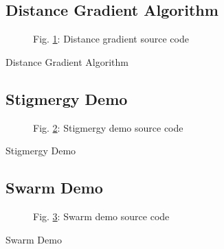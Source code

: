 \documentclass{beamer}
\begin{document}
	\subsection{Distance Gradient Algorithm}
	\begin{frame}
		\begin{figure}
			
			\caption{
				\label{figure:gradient code}Fig. \ref{figure:gradient code}: Distance gradient source code}
		\end{figure}
	\end{frame}
	\begin{frame}{Distance Gradient Algorithm}
		\centering
	\end{frame}
	\subsection{Stigmergy Demo}
	\begin{frame}
		\begin{figure}
			
			\caption{
				\label{figure:stigmergy code}Fig. \ref{figure:stigmergy code}: Stigmergy demo source code}
		\end{figure}
	\end{frame}
	\begin{frame}{Stigmergy Demo}
		\centering
	\end{frame}
	\subsection{Swarm Demo}
	\begin{frame}
		\begin{figure}
			
			\caption{
				\label{figure:swarm code}Fig. \ref{figure:swarm code}: Swarm demo source code}
		\end{figure}
	\end{frame}
	\begin{frame}{Swarm Demo}
		\centering
	\end{frame}
\end{document}

